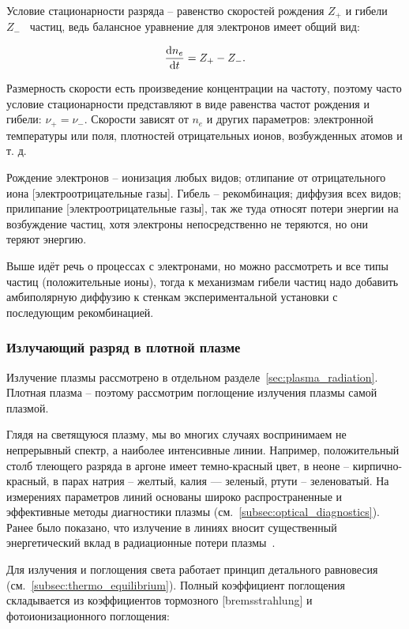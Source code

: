 \documentclass[10pt, a4paper]{article}
\begin{document}
Условие стационарности разряда -- равенство скоростей рождения $Z_{+}$ и гибели $Z_{-}$~\cite{raizer} частиц, ведь балансное уравнение для электронов имеет общий вид:

\begin{equation*}
	\dv{n_e}{t} = Z_{+}-Z_{-}.
\end{equation*}

Размерность скорости есть произведение концентрации на частоту, поэтому часто условие стационарности представляют в виде равенства частот рождения и гибели: $\nu_{+} = \nu_{-}$. Скорости зависят от $n_e$ и других параметров: электронной
температуры или поля, плотностей отрицательных ионов, возбужденных
атомов и т. д.

Рождение электронов -- ионизация любых видов; отлипание от отрицательного иона [электроотрицательные газы]. Гибель -- рекомбинация; диффузия всех видов; прилипание [электроотрицательные газы], так же туда относят потери энергии на возбуждение частиц, хотя электроны непосредственно не теряются, но они теряют энергию. 

Выше идёт речь о процессах с электронами, но можно рассмотреть и все типы частиц (положительные ионы), тогда к механизмам гибели частиц надо добавить амбиполярную диффузию к стенкам экспериментальной установки с последующим рекомбинацией.

\subsubsection{Излучающий разряд в плотной плазме}

Излучение плазмы рассмотрено в отдельном разделе~\ref{sec:plasma_radiation}. Плотная плазма -- поэтому рассмотрим поглощение излучения плазмы самой плазмой.

Глядя на светящуюся плазму, мы во многих случаях воспринимаем не непрерывный спектр, а наиболее интенсивные линии. Например, положительный столб тлеющего разряда в аргоне имеет темно-красный цвет, в неоне -- кирпично-красный, в парах натрия -- желтый, калия — зеленый, ртути -- зеленоватый. На измерениях параметров линий основаны широко распространенные и эффективные методы диагностики плазмы (см.~\ref{subsec:optical_diagnostics}). Ранее было показано, что излучение в линиях вносит существенный энергетический вклад в радиационные потери плазмы~\cite{raizer}.

Для излучения и поглощения света работает принцип детального равновесия (см.~\ref{subsec:thermo_equilibrium}). Полный коэффициент поглощения складывается из коэффициентов тормозного [bremsstrahlung] и фотоионизационного поглощения:
\end{document}
